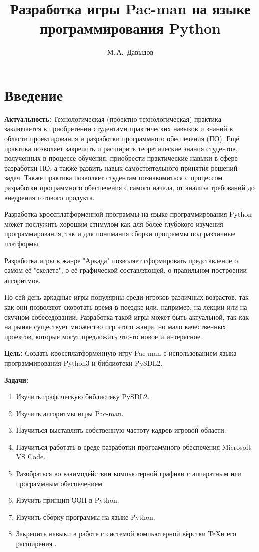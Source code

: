 \documentclass[14pt, oneside]{altsu-report}
\title{Разработка игры Pac-man на языке программирования Python}
\author{М.\,А.~Давыдов}
\institute{Институт цифровых технологий, электроники и физики}
\date{\the\year}
\begin{document}
\maketitle

\setcounter{page}{2}
\makeabstract
\tableofcontents

\chapter*{Введение}

\textbf{Актуальность:}
Технологическая (проектно-технологическая) практика заключается в приобретении студентами практических навыков и знаний в области проектирования и разработки программного обеспечения (ПО). Ещё практика позволяет закрепить и расширить теоретические знания студентов, полученных в процессе обучения, приобрести практические навыки в сфере разработки ПО, а также развить навык самостоятельного принятия решений задач. Также практика позволяет студентам познакомиться с процессом разработки программного обеспечения с самого начала, от анализа требований до внедрения готового продукта.

Разработка кроссплатформенной программы на языке программирования Python может послужить хорошим стимулом как для более глубокого изучения программирования, так и для понимания сборки программы под различные платформы.

Разработка игры в жанре "Аркада" позволяет сформировать представление о самом её "скелете", о её графической составляющей, о правильном построении алгоритмов.

По сей день аркадные игры популярны среди игроков различных возрастов, так как они позволяют скоротать время в поездке или, например, на лекции или на скучном собеседовании. Разработка такой игры может быть актуальной, так как на рынке существует множество игр этого жанра, но мало качественных проектов, которые могут предложить что-то новое и интересное.

\textbf{Цель:}
Создать кроссплатформенную игру Pac-man с использованием языка программирования Python3 и библиотеки PySDL2.

\textbf{Задачи:}
\begin{enumerate}
	\item Изучить графическую библиотеку PySDL2.
	\item Изучить алгоритмы игры Pac-man.
	\item Научиться выставлять собственную частоту кадров игровой области.
	\item Научиться работать в среде разработки программного обеспечения Microsoft VS Code.
	\item Разобраться во взаимодействии компьютерной графики с аппаратным или программным обеспечением.
	\item Изучить принцип ООП в Python.
	\item Изучить сборку программы на языке Python.
	\item Закрепить навыки в работе с системой компьютерной вёрстки \TeX и его расширения \XeTeX.
\end{enumerate}
\end{document}
